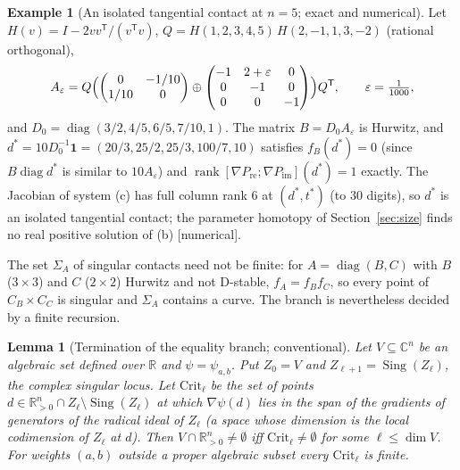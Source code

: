 \documentclass[11pt,a4paper]{article}
\theoremstyle{plain}
\newtheorem{lemma}[theorem]{Lemma}
\theoremstyle{definition}
\newtheorem{example}[theorem]{Example}
\newcommand{\R}{\mathbb{R}}
\newcommand{\C}{\mathbb{C}}
\newcommand{\Rp}{\R^n_{>0}}
\newcommand{\diag}{\operatorname{diag}}
\newcommand{\Pre}{P_{\mathrm{re}}}
\newcommand{\Pim}{P_{\mathrm{im}}}
\begin{document}
\begin{example}[An isolated tangential contact at $n=5$; exact and numerical]\label{ex:tangential}
Let $H(v)=I-2vv^{\mathsf T}/(v^{\mathsf T}v)$, $Q=H(1,2,3,4,5)\,H(2,-1,1,3,-2)$ (rational orthogonal),
\[A_\varepsilon=Q\Bigl(\begin{pmatrix}0&-1/10\\1/10&0\end{pmatrix}\oplus
\begin{pmatrix}-1&2+\varepsilon&0\\0&-1&0\\0&0&-1\end{pmatrix}\Bigr)Q^{\mathsf T},\qquad\varepsilon=\tfrac1{1000},\]
and $D_0=\diag(3/2,4/5,6/5,7/10,1)$. The matrix $B=D_0A_\varepsilon$ is Hurwitz, and $d^{*}=10D_0^{-1}\mathbf 1
=(20/3,25/2,25/3,100/7,10)$ satisfies $f_B(d^{*})=0$ (since $B\diag d^{*}$ is similar to $10A_\varepsilon$) and
$\operatorname{rank}[\nabla\Pre;\nabla\Pim](d^{*})=1$ exactly. The Jacobian of system (c) has full column rank $6$ at
$(d^{*},t^{*})$ (to 30 digits), so $d^{*}$ is an isolated tangential contact; the parameter homotopy of
Section~\ref{sec:size} finds no real positive solution of (b) [numerical].
\end{example}

The set $\Sigma_A$ of singular contacts need not be finite: for $A=\diag(B,C)$ with $B$ ($3\times3$) and $C$ ($2\times2$)
Hurwitz and not D-stable, $f_A=f_Bf_C$, so every point of $C_B\times C_C$ is singular and $\Sigma_A$ contains a curve.
The branch is nevertheless decided by a finite recursion.

\begin{lemma}[Termination of the equality branch; conventional]\label{lem:termination}
Let $V\subseteq\C^n$ be an algebraic set defined over $\R$ and $\psi=\psi_{a,b}$. Put $Z_0=V$ and
$Z_{\ell+1}=\operatorname{Sing}(Z_\ell)$, the complex singular locus. Let $\mathrm{Crit}_\ell$ be the set of points
$d\in\Rp\cap Z_\ell\setminus\operatorname{Sing}(Z_\ell)$ at which $\nabla\psi(d)$ lies in the span of the gradients of
generators of the radical ideal of $Z_\ell$ (a space whose dimension is the local codimension of $Z_\ell$ at $d$).
Then $V\cap\Rp\neq\emptyset$ iff $\mathrm{Crit}_\ell\neq\emptyset$ for some $\ell\le\dim V$. For weights $(a,b)$
outside a proper algebraic subset every $\mathrm{Crit}_\ell$ is finite.
\end{lemma}
\end{document}

